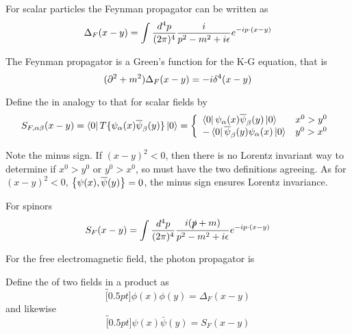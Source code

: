 \documentclass{article}
\begin{document}
\begin{theorem}
For scalar particles the Feynman propagator can be written as 
\[
\Delta_F(x-y) = \int \fmeas \frac{i}{p^2-m^2+i\eps} e^{-ip\cdot(x-y)}
\]
\end{theorem}

\begin{corollary}
The Feynman propagator is a Green's function for the K-G equation, that is 
\[
(\del^2+m^2)\Delta_F(x-y) = -i \delta^4(x-y)
\]
\end{corollary}

\begin{definition}
Define the  in analogy to that for scalar fields by 
\[
S_{F,\alpha\beta}(x-y)=\bra{0} T\{ \psi_\alpha(x) \bar{\psi}_\beta(y) \} \ket{0} = \left\{ \begin{array}{lc} \bra{0} \psi_\alpha(x) \bar{\psi}_\beta(y)  \ket{0} & x^0 > y^0 \\
    -\bra{0} \bar{\psi}_\beta(y) \psi_\alpha(x) \ket{0} & y^0 > x^0 
    \end{array} \right. \\ 
\]
\end{definition}

\begin{idea}
Note the minus sign. If $(x-y)^2 < 0$, then there is no Lorentz invariant way to determine if $x^0 > y^0$ or $y^0 > x^0$, so must have the two definitions agreeing. As for $(x-y)^2 < 0$, $\acomm[\psi(x)]{\bar{\psi}(y)}=0$, the minus sign ensures Lorentz invariance. 
\end{idea}

\begin{theorem}
For spinors 
\[
S_F(x-y) = \int \fmeas \frac{i(\slashed{p}+m)}{p^2-m^2+i\eps} e^{-ip\cdot (x-y)}
\]
\end{theorem}

\begin{theorem}
For the free electromagnetic field, the photon propagator is 
\end{theorem}

\begin{definition}[Contraction]
Define the  of two fields in a product as 
\[
\overbracket[0.5pt]{\phi(x)\phi(y)} = \Delta_F(x-y)
\]
and likewise 
\[
\overbracket[0.5pt]{\psi(x)\bar{\psi}(y)} = S_F(x-y)
\]
\end{definition}
\end{document}
